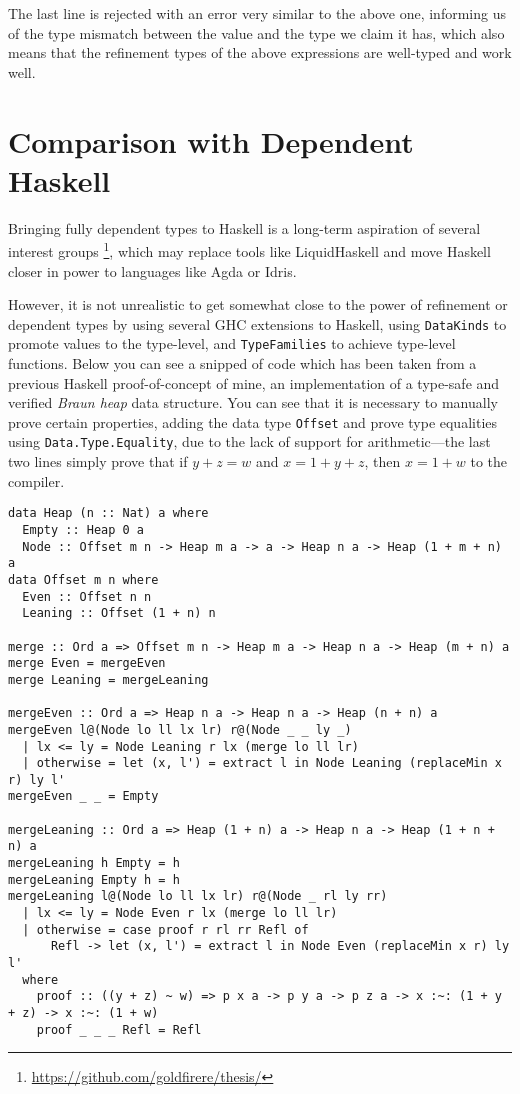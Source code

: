 \documentclass[11pt]{article}
\begin{document}
The last line is rejected with an error very similar to the above one, informing
us of the type mismatch between the value and the type we claim it has, which
also means that the refinement types of the above expressions are well-typed and
work well.

\section{Comparison with Dependent Haskell}
\label{sec:org66dc263}
Bringing fully dependent types to Haskell is a long-term aspiration of several
interest groups \footnote{\url{https://github.com/goldfirere/thesis/}}, which may replace tools like LiquidHaskell and move
Haskell closer in power to languages like Agda or Idris.

However, it is not unrealistic to get somewhat close to the power of refinement
or dependent types by using several GHC extensions to Haskell, using \texttt{DataKinds}
to promote values to the type-level, and \texttt{TypeFamilies} to achieve type-level
functions. Below you can see a snipped of code which has been taken from a
previous Haskell proof-of-concept of mine, an implementation of a type-safe and
verified \emph{Braun heap} data structure. You can see that it is necessary to manually
prove certain properties, adding the data type \texttt{Offset} and prove type equalities
using \texttt{Data.Type.Equality}, due to the lack of support for arithmetic---the last
two lines simply prove that if \(y + z = w\) and \(x = 1 + y + z\), then \(x = 1 + w\)
to the compiler.

\begin{verbatim}
data Heap (n :: Nat) a where
  Empty :: Heap 0 a
  Node :: Offset m n -> Heap m a -> a -> Heap n a -> Heap (1 + m + n) a
data Offset m n where
  Even :: Offset n n
  Leaning :: Offset (1 + n) n

merge :: Ord a => Offset m n -> Heap m a -> Heap n a -> Heap (m + n) a
merge Even = mergeEven
merge Leaning = mergeLeaning

mergeEven :: Ord a => Heap n a -> Heap n a -> Heap (n + n) a
mergeEven l@(Node lo ll lx lr) r@(Node _ _ ly _)
  | lx <= ly = Node Leaning r lx (merge lo ll lr)
  | otherwise = let (x, l') = extract l in Node Leaning (replaceMin x r) ly l'
mergeEven _ _ = Empty

mergeLeaning :: Ord a => Heap (1 + n) a -> Heap n a -> Heap (1 + n + n) a
mergeLeaning h Empty = h
mergeLeaning Empty h = h
mergeLeaning l@(Node lo ll lx lr) r@(Node _ rl ly rr)
  | lx <= ly = Node Even r lx (merge lo ll lr)
  | otherwise = case proof r rl rr Refl of
      Refl -> let (x, l') = extract l in Node Even (replaceMin x r) ly l'
  where
    proof :: ((y + z) ~ w) => p x a -> p y a -> p z a -> x :~: (1 + y + z) -> x :~: (1 + w)
    proof _ _ _ Refl = Refl
\end{verbatim}
\end{document}
